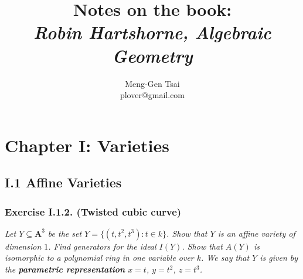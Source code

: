 \documentclass{article}
\title{\textbf{Notes on the book: \\ \emph{Robin Hartshorne, Algebraic Geometry}}}
\author{Meng-Gen Tsai \\ plover@gmail.com}
\begin{document}
\maketitle
\tableofcontents












\newpage
\section*{Chapter I: Varieties \\}



\subsection*{I.1 Affine Varieties \\}



\subsubsection*{Exercise I.1.2. (Twisted cubic curve)}
\emph{Let $Y \subseteq \mathbf{A}^3$ be the set $Y = \{(t,t^2,t^3) : t \in k\}$.
Show that $Y$ is an affine variety of dimension $1$.
Find generators for the ideal $I(Y)$.
Show that $A(Y)$ is isomorphic to a polynomial ring in one variable over $k$.
We say that $Y$ is given by the \textbf{parametric representation} $x=t$, $y=t^2$, $z=t^3$.} \\
\end{document}
